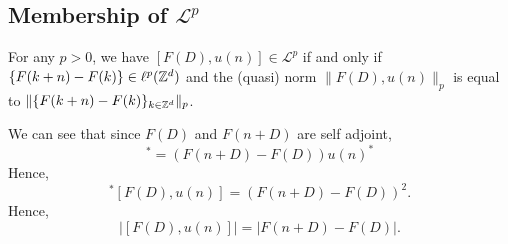 



\subsection{Membership of $\mathcal{L}^p$}
\begin{proposition}
\label{LpConditions}
    
For any $p > 0$, we have $[F(D),u(n)] \in \mathcal{L}^p$ if and only if
$\{F(k+n)-F(k)\} \in \ell^p(\mathbb{Z}^d)$ and
the (quasi) norm $\|F(D),u(n)\|_p$ is equal to $\|\{F(k+n)-F(k)\}_{k \in \mathbb{Z}^d}\|_p$.


\end{proposition}
We can see that since $F(D)$ and $F(n+D)$ are self adjoint, 
\begin{equation}
    [F(D),u(n)]^* = (F(n+D)-F(D))u(n)^*
\end{equation}
Hence,
\begin{equation}
    [F(D),u(n)]^*[F(D),u(n)] = (F(n+D)-F(D))^2.
\end{equation}
Hence,
\begin{equation}
    |[F(D),u(n)]| = |F(n+D)-F(D)|.
\end{equation}

